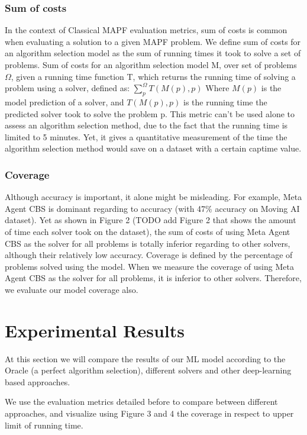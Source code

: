 \documentclass[letterpaper]{article} %
\begin{document}
\subsubsection{Sum of costs}
In the context of Classical MAPF evaluation metrics, sum of costs is common when evaluating a solution to a given MAPF problem.
We define sum of costs for an algorithm selection model as the sum of running times it took to solve a set of problems.
Sum of costs for an algorithm selection model M, over set of problems $\Omega$, given a running time function T, which returns the running time of solving a problem using a solver, defined as:\medskip
$\sum_{p}^{\Omega} T(M(p), p)$
Where $M(p)$ is the model prediction of a solver, and $T(M(p),p)$ is the running time the predicted solver took to solve the problem p.
This metric can't be used alone to assess an algorithm selection method, due to the fact that the running time is limited to 5 minutes. Yet, it gives a quantitative measurement of the time the algorithm selection method would save on a dataset with a certain captime value.

\subsubsection{Coverage}
Although accuracy is important, it alone might be misleading. For example, Meta Agent CBS is dominant regarding to accuracy (with 47\% accuracy on Moving AI dataset). Yet as shown in Figure 2 (TODO add Figure 2 that shows the amount of time each solver took on the dataset), the sum of costs of using Meta Agent CBS as the solver for all problems is totally inferior regarding to other solvers, although their relatively low accuracy.
Coverage is defined by the percentage of problems solved using the model. When we measure the coverage of using Meta Agent CBS as the solver for all problems, it is inferior to other solvers.
Therefore, we evaluate our model coverage also.


\section{Experimental Results}
At this section we will compare the results of our ML model according to the Oracle (a perfect algorithm selection), different solvers and other deep-learning based approaches.

We use the evaluation metrics detailed before to compare between different approaches, and visualize using Figure 3 and 4 the coverage in respect to upper limit of running time.
\end{document}
